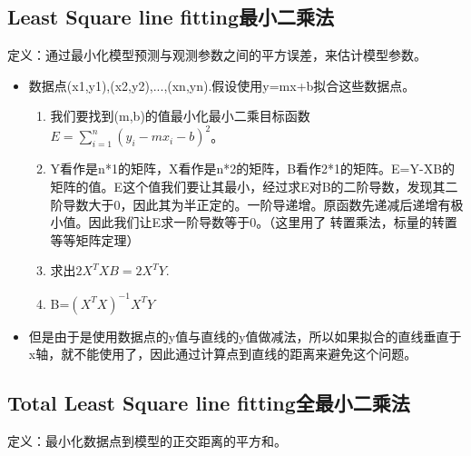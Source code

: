 \documentclass[UTF8]{ctexart}
\begin{document}
\subsection{Least Square line fitting最小二乘法}

定义：通过最小化模型预测与观测参数之间的平方误差，来估计模型参数。

\begin{itemize}
    \item 数据点(x1,y1),(x2,y2),...,(xn,yn).假设使用y=mx+b拟合这些数据点。
    \begin{enumerate}
        \item 我们要找到(m,b)的值最小化最小二乘目标函数$E=\sum_{i=1}^{n}(y_i-mx_i-b)^2$。
        \item Y看作是n*1的矩阵，X看作是n*2的矩阵，B看作2*1的矩阵。E=Y-XB的矩阵的值。E这个值我们要让其最小，经过求E对B的二阶导数，发现其二阶导数大于0，因此其为半正定的。一阶导递增。原函数先递减后递增有极小值。因此我们让E求一阶导数等于0。（这里用了 转置乘法，标量的转置等等矩阵定理）
        \item 求出$2X^TXB=2X^TY$.
        \item B=$(X^TX)^{-1}X^TY$
    \end{enumerate}
    \item 但是由于是使用数据点的y值与直线的y值做减法，所以如果拟合的直线垂直于x轴，就不能使用了，因此通过计算点到直线的距离来避免这个问题。
\end{itemize}

\subsection{Total Least Square line fitting全最小二乘法}

定义：最小化数据点到模型的正交距离的平方和。
\end{document}
